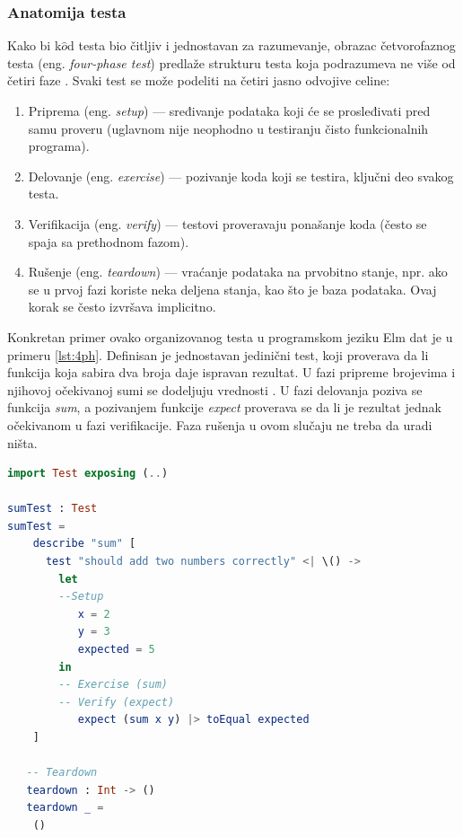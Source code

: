 \documentclass[12pt,oneside]{memoir}
\begin{document}
\subsubsection{Anatomija testa}
\par Kako bi k$\hat{o}$d testa bio čitljiv i jednostavan za razumevanje, obrazac četvorofaznog testa (eng. \emph{four-phase test}) predlaže strukturu testa koja podrazumeva ne više od četiri faze \cite{4phase}. Svaki test se može podeliti na četiri jasno odvojive celine:  
\begin{enumerate}
\item Priprema (eng. \emph{setup}) --- sređivanje podataka koji će se prosleđivati pred samu proveru (uglavnom nije neophodno u testiranju čisto funkcionalnih programa).
\item Delovanje (eng. \emph{exercise}) --- pozivanje koda koji se testira, ključni deo svakog testa.
\item Verifikacija (eng. \emph{verify}) --- testovi proveravaju ponašanje koda (često se spaja sa prethodnom fazom). 
\item Rušenje (eng. \emph{teardown}) --- vraćanje podataka na prvobitno stanje, npr. ako se u prvoj fazi koriste neka deljena stanja, kao što je baza podataka. Ovaj korak se često izvršava implicitno. 
\end{enumerate}

\par Konkretan primer ovako organizovanog testa u programskom jeziku Elm dat je u primeru \ref{lst:4ph}. Definisan je jednostavan jedinični test, koji proverava da li funkcija koja sabira dva broja daje ispravan rezultat. U fazi pripreme brojevima i njihovoj očekivanoj sumi se dodeljuju vrednosti . U fazi delovanja poziva se funkcija \emph{sum}, a pozivanjem funkcije \emph{expect} proverava se da li je rezultat jednak očekivanom u fazi verifikacije. Faza rušenja u ovom slučaju ne treba da uradi ništa.

\begin{lstlisting}[language=elm, caption={Četiri faze jediničnog testa koji proverava ispravnost
funkcije sabiranja dva broja},captionpos=b, label={lst:4ph}]
import Test exposing (..)

sumTest : Test
sumTest =
    describe "sum" [
      test "should add two numbers correctly" <| \() -> 
        let
        --Setup
           x = 2
           y = 3
           expected = 5
        in
        -- Exercise (sum)
        -- Verify (expect)
           expect (sum x y) |> toEqual expected
    ]

   -- Teardown
   teardown : Int -> ()
   teardown _ =
    ()
\end{lstlisting}
\end{document}

